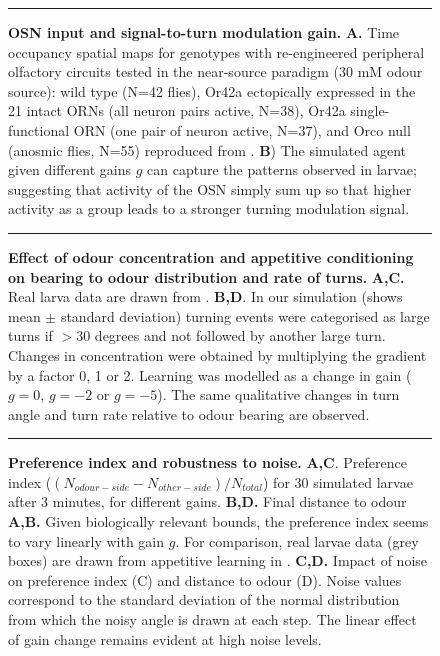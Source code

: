 \documentclass[11pt,a4paper]{article}
\newcommand{\todoBW}[1]{\todo[author=BW,color=orange, size=\tiny,inline]{#1}}
\begin{document}
\begin{figure}[ht!]
\begin{center}
\caption{{\bf OSN input and signal-to-turn modulation gain.}
{\bf A.} Time occupancy spatial maps for genotypes with re-engineered peripheral olfactory circuits tested in the near-source paradigm (30 mM odour source): wild type (N=42 flies), Or42a ectopically expressed in the 21 intact ORNs (all neuron pairs active, N=38), Or42a single-functional ORN (one pair of neuron active, N=37), and Orco null (anosmic flies, N=55) reproduced from \cite{gomez2011active}.
{\bf B}) The simulated agent given different gains $g$ can capture the patterns observed in larvae; suggesting that activity of the OSN simply sum up so that higher activity as a group leads to a stronger turning modulation signal.
\label{fig:OSN}}
\end{center}
\hrule
\end{figure}


\begin{figure}
\begin{center}
\caption{{\bf Effect of odour concentration and appetitive conditioning on bearing to odour distribution and rate of turns.} {\bf A,C.} Real larva data are drawn from \citep{schleyer2015impact}. {\bf B,D}. In our simulation (shows mean $\pm$ standard deviation) turning events were categorised as large turns if $>30$ degrees and not followed by another large turn. Changes in concentration were obtained by multiplying the gradient by a factor 0, 1 or 2. Learning was modelled as a change in gain ($g=0$, $g=-2$ or $g=-5$). The same qualitative changes in turn angle and turn rate relative to odour bearing are observed.
\label{fig:Concentration}}
\end{center}
\hrule
\end{figure}

\begin{figure}
\begin{center}
\caption{{\bf Preference index and robustness to noise. }
{\bf A,C}. Preference index ($(N_{odour-side}-N_{other-side})/N_{total}$) for 30 simulated larvae after 3 minutes, for different gains. {\bf B,D.} Final distance to odour 
{\bf A,B.} Given biologically relevant bounds, the preference index seems to vary linearly with  gain $g$. For comparison, real larvae data (grey boxes) are drawn from appetitive learning in \citep{schleyer2011behavior}.
{\bf C,D.} Impact of noise on preference index (C) and distance to odour (D). Noise values correspond to the standard deviation of the normal distribution from which the noisy angle is drawn at each step. The linear effect of gain change remains evident at high noise levels.
\label{fig:PreferenceIndex}}
\end{center}
\hrule
\end{figure}
\end{document}
